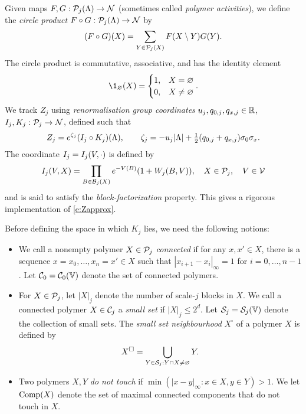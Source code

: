 Given maps $F, G : \mathcal{P}_j(\Lambda) \rightarrow \mathcal{N}$ (sometimes called \emph{polymer activities}),
we define the \emph{circle product} $F \circ G : \mathcal{P}_j(\Lambda) \rightarrow \mathcal{N}$ by
\begin{equation}
\label{e:circ}
(F \circ G)(X) = \sum_{Y\in\mathcal{P}_j(X)} F(X \setminus Y) G(Y).
\end{equation}
The circle product is commutative, associative, and has the identity element
\begin{equation}
\1_\varnothing(X) =
\begin{cases}
1,	& X = \varnothing \\
0,	& X \ne \varnothing
\end{cases}.
\end{equation}
We track $Z_j$ using \emph{renormalisation group coordinates}
$u_j, q_{0,j}, q_{x,j} \in {\mathbb R}$,
$I_j, K_j : \mathcal{P}_j \rightarrow \mathcal{N}$, defined such that
\begin{equation}
\label{e:IcircKnew}
	Z_j = e^{\zeta_j}(I_j\circ K_j)(\Lambda),
	\qquad
	\zeta_j= - u_j|\Lambda|
	+ \textstyle{\frac 12} (q_{0,j} + q_{x,j}) \sigma_0\sigma_x
	.
\end{equation}
The coordinate $I_j = I_j(V, \cdot)$ is defined by
\begin{equation}
\label{e:Idef}
I_j(V, X)
	=
\prod_{B \in \mathcal{B}_j(X)} e^{-V(B)} (1 + W_j(B, V)), \quad X \in \mathcal{P}_j,
	\quad
V \in \mathcal{V}
\end{equation}
and is said to satisfy the \emph{block-factorization} property.
This gives a rigorous implementation of \eqref{e:Zapprox}.

Before defining the space in which $K_j$ lies, we need the following notions:
\begin{itemize}
\item
We call a nonempty polymer $X\in \mathcal{P}_j$ \emph{connected}
if for any $x, x' \in X$, there is a sequence
$x = x_0, \ldots, x_n = x' \in X$ such that
$|x_{i+1} - x_i|_\infty = 1$ for $i = 0, \ldots, n - 1$.
Let $\mathcal{C}_0 = \mathcal{C}_0(\mathbb{V})$ denote the set of connected polymers.

\item
For $X \in \mathcal{P}_j$, let $|X|_j$ denote the number of scale-$j$ blocks in $X$.
We call a connected polymer $X\in\mathcal{C}_j$ a \emph{small set} if $|X|_j \le 2^d$.
Let $\mathcal{S}_j = \mathcal{S}_j(\mathbb{V})$ denote the collection of small sets.
The \emph{small set neighbourhood} $X^\square$ of a polymer $X$ is defined by
\begin{equation}
\label{e:ssn}
X^\Box = \bigcup_{Y\in\mathcal{S}_j : Y \cap X \ne \varnothing} Y.
\end{equation}

\item
Two polymers $X, Y$ \emph{do not touch} if $\min(|x - y|_\infty : x \in X, y \in Y) > 1$.
We let ${\rm Comp}(X)$ denote the set of maximal connected components that do not touch
in $X$.
\end{itemize}

